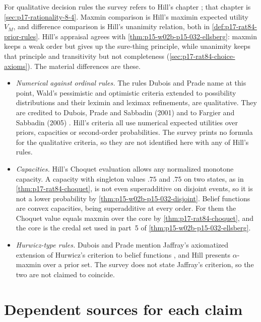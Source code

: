For qualitative decision rules the survey refers to Hill's chapter
\cite[p.~308]{DuboisPrade2021RepresentingBelief}; that chapter is
\cref{sec:p17-rationality-8-4}. Maxmin comparison is Hill's maximin
expected utility \(V_M\), and difference comparison is Hill's unanimity
relation, both in \cref{def:p17-rat84-prior-rules}. Hill's appraisal agrees
with \cref{thm:p15-w02b-p15-032-ellsberg}: maxmin keeps a weak order but
gives up the sure-thing principle, while unanimity keeps that principle
and transitivity but not completeness (\cref{sec:p17-rat84-choice-axioms}).
The material differences are these.
\begin{itemize}
\item \emph{Numerical against ordinal rules.} The rules Dubois and Prade
  name at this point, Wald's pessimistic and optimistic criteria extended
  to possibility distributions and their leximin and leximax refinements,
  are qualitative. They are credited to Dubois, Prade and Sabbadin (2001)
  and to Fargier and Sabbadin (2005)
  \cite{R47DuboisPradeSabbadin2001,R47FargierSabbadin2005}. Hill's criteria
  all use numerical expected utilities over priors, capacities or
  second-order probabilities. The survey prints no formula for the
  qualitative criteria, so they are not identified here with any of
  Hill's rules.
\item \emph{Capacities.} Hill's Choquet evaluation allows any normalized
  monotone capacity. A capacity with singleton values \(.75\) and \(.75\)
  on two states, as in \cref{thm:p17-rat84-choquet}, is not even
  superadditive on disjoint events, so it is not a lower probability by
  \cref{thm:p15-w02b-p15-032-disjoint}. Belief functions are convex
  capacities, being superadditive at every order. For them the Choquet
  value equals maxmin over the core by \cref{thm:p17-rat84-choquet}, and the
  core is the credal set used in part~5 of
  \cref{thm:p15-w02b-p15-032-ellsberg}.
\item \emph{Hurwicz-type rules.} Dubois and Prade mention Jaffray's
  axiomatized extension of Hurwicz's criterion to belief functions
  \cite{R47Jaffray1989}, and Hill presents \(\alpha\)-maxmin over a prior
  set. The survey does not state Jaffray's criterion, so the two are not
  claimed to coincide.
\end{itemize}

\section{Dependent sources for each claim}
\label{sec:p15-w02b-p15-032-sources}

